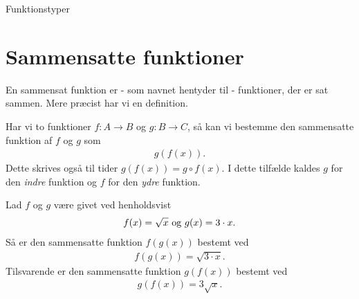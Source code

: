 \begin{center}
\Huge
Funktionstyper 
\end{center}
\section*{Sammensatte funktioner}
En sammensat funktion er - som navnet hentyder til - funktioner, der er sat sammen. Mere præcist har vi en definition.
\begin{defn}
Har vi to funktioner $f:A \to B$ og $g:B \to C$, så kan vi bestemme  den sammensatte funktion af $f$ og $g$ som
\begin{align*}
g(f(x)).
\end{align*}
Dette skrives også til tider $g(f(x))= g\circ f(x)$. I dette tilfælde kaldes $g$ for den \textit{indre} funktion og $f$ for den \textit{ydre} funktion.
\end{defn}
\begin{figure}[H]
	\centering
\end{figure}
\begin{exa}
Lad $f$ og $g$ være givet ved henholdsvist
\begin{align*}
f(x) = \sqrt{x} \textnormal{ og }g(x) = 3\cdot x.
\end{align*}
Så er den sammensatte funktion $f(g(x))$ bestemt ved
\begin{align*}
f(g(x)) = \sqrt{3\cdot x}.
\end{align*}
Tilsvarende er den sammensatte funktion $g(f(x))$ bestemt ved
\begin{align*}
g(f(x)) = 3\sqrt{x}.
\end{align*}
\end{exa}
